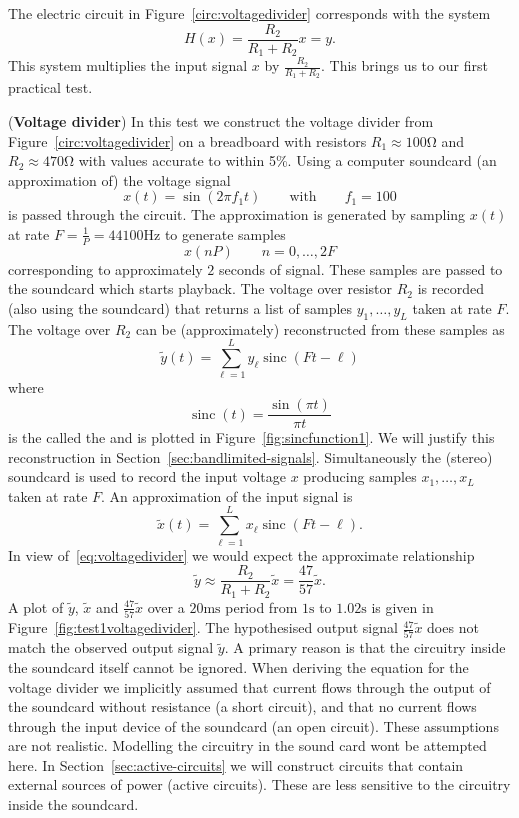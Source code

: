 The electric circuit in Figure~\ref{circ:voltagedivider} corresponds with the system
\[
H(x) = \frac{R_2}{R_1 + R_2} x = y.
\]
This system multiplies the input signal $x$ by $\frac{R_2}{R_1 + R_2}$.  This brings us to our first practical test.

\newcommand{\sinc}{\operatorname{sinc}}
\begin{test}\label{test:voltagedividertest1}
(\textbf{Voltage divider})
In this test we construct the voltage divider from Figure~\ref{circ:voltagedivider} on a breadboard with resistors $R_1 \approx 100\si{\ohm}$ and $R_2 \approx 470\si{\ohm}$ with values accurate to within 5\%.  Using a computer soundcard (an approximation of) the voltage signal 
\[
x(t) = \sin( 2 \pi f_1 t) \qquad  \text{with} \qquad  f_1 = 100
\] 
is passed through the circuit.  The approximation is generated by sampling $x(t)$ at rate $F = \frac{1}{P} = 44100\si{\hertz}$ to generate samples 
\[
x(n P) \qquad n = 0, \dots, 2 F
\]
corresponding to approximately $2$ seconds of signal.  These samples are passed to the soundcard which starts playback.  The voltage over resistor $R_2$ is recorded (also using the soundcard) that returns a list of samples $y_1,\dots,y_L$ taken at rate $F$.  The voltage over $R_2$ can be (approximately) reconstructed from these samples as
\begin{equation}\label{eq:yreconstruct}
\tilde{y}(t) = \sum_{\ell=1}^L y_\ell \sinc( F t - \ell )
\end{equation}
where
\begin{equation}\label{eq:sincfunction}
\sinc(t) = \frac{\sin(\pi t)}{\pi t}
\end{equation}
is the called the  and is plotted in Figure~\ref{fig:sincfunction1}. We will justify this reconstruction in Section~\ref{sec:bandlimited-signals}.  Simultaneously the (stereo) soundcard is used to record the input voltage $x$ producing samples $x_1,\dots,x_L$ taken at rate $F$.  An approximation of the input signal is  
\begin{equation}\label{eq:xreconstruct}
\tilde{x}(t) = \sum_{\ell=1}^L x_\ell \sinc( F t - \ell ).
\end{equation}
In view of~\eqref{eq:voltagedivider} we would expect the approximate relationship
\[
\tilde{y} \approx \frac{R_2}{R_1 + R_2} \tilde{x} = \frac{47}{57}\tilde{x}.
\]
A plot of $\tilde{y}$, $\tilde{x}$ and $\tfrac{47}{57}\tilde{x}$ over a $20\si{\milli\second}$ period from $1\si{\second}$ to $1.02\si{\second}$ is given in Figure~\ref{fig:test1voltagedivider}.  The hypothesised output signal $\tfrac{47}{57}\tilde{x}$ does not match the observed output signal $\tilde{y}$.  A primary reason is that the circuitry inside the soundcard itself cannot be ignored.  When deriving the equation for the voltage divider we implicitly assumed that current flows through the output of the soundcard without resistance (a short circuit), and that no current flows through the input device of the soundcard (an open circuit).  These assumptions are not realistic.  Modelling the circuitry in the sound card wont be attempted here.  In Section~\ref{sec:active-circuits} we will construct circuits that contain external sources of power (active circuits).  These are less sensitive to the circuitry inside the soundcard.  


\end{test}
